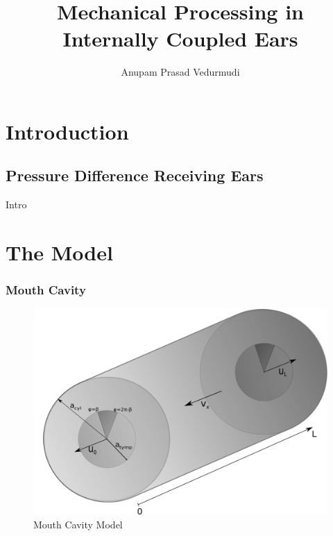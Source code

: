 \documentclass{beamer}
\title{Mechanical Processing in Internally Coupled Ears}
\author{Anupam Prasad Vedurmudi}
\begin{document}
\begin{frame}
 \titlepage
\end{frame}

\section{Introduction}
\subsection{Pressure Difference Receiving Ears}
\begin{frame}
 Intro
\end{frame}

\section{The Model}

\begin{frame}
\frametitle{Mouth Cavity}
\begin{figure}[htr]
\includegraphics[width=.38\textwidth]{Diagrams/newCylinder.png}
\caption{Mouth Cavity Model}
\end{figure}

\end{frame}
\end{document}
